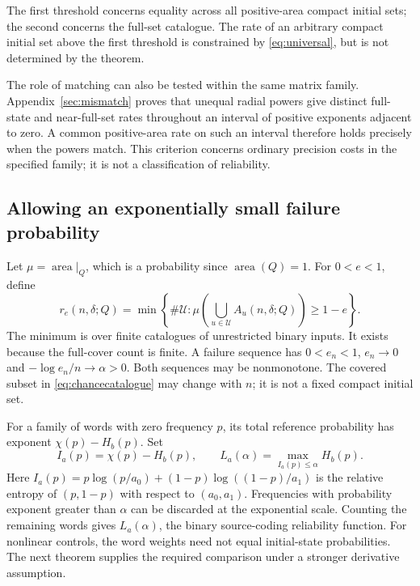 \documentclass[11pt]{amsart}
\theoremstyle{definition}
\theoremstyle{remark}
\newcommand{\area}{\operatorname{area}}
\numberwithin{equation}{section}
\begin{document}
The first threshold concerns equality across all positive-area
compact initial sets; the second concerns the full-set catalogue.
The rate of an arbitrary compact initial set above the first
threshold is constrained by \eqref{eq:universal}, but is not
determined by the theorem.

The role of matching can also be tested within the same matrix
family. Appendix~\ref{sec:mismatch} proves that unequal radial
powers give distinct full-state and near-full-set rates throughout
an interval of positive exponents adjacent to zero. A common
positive-area rate on such an interval therefore holds precisely
when the powers match. This criterion concerns ordinary precision costs in the
specified family; it is not a classification of reliability.

\subsection{Allowing an exponentially small failure probability}
Let $\mu=\area|_Q$, which is a probability since $\area(Q)=1$.
For $0<e<1$, define
\begin{equation}\label{eq:chancecatalogue}
r_e(n,\delta;Q)=\min\left\{\#\mathcal U:
\mu\left(\bigcup_{u\in\mathcal U}A_u(n,\delta;Q)\right)\ge1-e\right\}.
\end{equation}
The minimum is over finite catalogues of unrestricted binary inputs.
It exists because the full-cover count is finite.
A failure sequence has $0<e_n<1$, $e_n\to0$ and
$-\log e_n/n\to\alpha>0$. Both sequences may be nonmonotone.
The covered subset in \eqref{eq:chancecatalogue} may
change with $n$; it is not a fixed compact initial set.


For a family of words with zero frequency $p$, its total reference
probability has exponent $\chi(p)-H_b(p)$. Set
\begin{equation}\label{eq:reliabilityfunction}
I_a(p)=\chi(p)-H_b(p),\qquad
L_a(\alpha)=\max_{I_a(p)\le\alpha}H_b(p).
\end{equation}
Here $I_a(p)=p\log(p/a_0)+(1-p)\log((1-p)/a_1)$ is the
relative entropy of $(p,1-p)$ with respect to $(a_0,a_1)$.
Frequencies with probability exponent greater than $\alpha$ can
be discarded at the exponential scale. Counting the remaining
words gives $L_a(\alpha)$, the binary source-coding reliability
function. For nonlinear controls, the word weights need not equal
initial-state probabilities. The next theorem supplies the required
comparison under a stronger derivative assumption.
\end{document}
